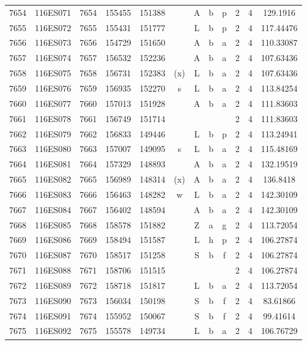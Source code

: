 \begin{tabular}{|*{12}{c|}}
7654 & 116ES071 & 7654 & 155455 & 151388 &  & A & b & p & 2 & 4 & 129.1916 \\ 
7655 & 116ES072 & 7655 & 155431 & 151777 &  & L & b & p & 2 & 4 & 117.44476 \\ 
7656 & 116ES073 & 7656 & 154729 & 151650 &  & A & b & a & 2 & 4 & 110.33087 \\ 
7657 & 116ES074 & 7657 & 156532 & 152236 &  & A & b & a & 2 & 4 & 107.63436 \\ 
7658 & 116ES075 & 7658 & 156731 & 152383 & (x) & L & b & a & 2 & 4 & 107.63436 \\ 
7659 & 116ES076 & 7659 & 156935 & 152270 & s & L & b & a & 2 & 4 & 113.84254 \\ 
7660 & 116ES077 & 7660 & 157013 & 151928 &  & A & b & a & 2 & 4 & 111.83603 \\ 
7661 & 116ES078 & 7661 & 156749 & 151714 &  &  &  &  & 2 & 4 & 111.83603 \\ 
7662 & 116ES079 & 7662 & 156833 & 149446 &  & L & b & p & 2 & 4 & 113.24941 \\ 
7663 & 116ES080 & 7663 & 157007 & 149095 & s & L & b & a & 2 & 4 & 115.48169 \\ 
7664 & 116ES081 & 7664 & 157329 & 148893 &  & A & b & a & 2 & 4 & 132.19519 \\ 
7665 & 116ES082 & 7665 & 156989 & 148314 & (x) & A & b & a & 2 & 4 & 136.8418 \\ 
7666 & 116ES083 & 7666 & 156463 & 148282 & w & L & b & a & 2 & 4 & 142.30109 \\ 
7667 & 116ES084 & 7667 & 156402 & 148594 &  & A & b & a & 2 & 4 & 142.30109 \\ 
7668 & 116ES085 & 7668 & 158578 & 151882 &  & Z & a & g & 2 & 4 & 113.72054 \\ 
7669 & 116ES086 & 7669 & 158494 & 151587 &  & L & h & p & 2 & 4 & 106.27874 \\ 
7670 & 116ES087 & 7670 & 158517 & 151258 &  & S & b & f & 2 & 4 & 106.27874 \\ 
7671 & 116ES088 & 7671 & 158706 & 151515 &  &  &  &  & 2 & 4 & 106.27874 \\ 
7672 & 116ES089 & 7672 & 158718 & 151817 &  & L & b & a & 2 & 4 & 113.72054 \\ 
7673 & 116ES090 & 7673 & 156034 & 150198 &  & S & b & f & 2 & 4 & 83.61866 \\ 
7674 & 116ES091 & 7674 & 155952 & 150067 &  & S & b & f & 2 & 4 & 99.41614 \\ 
7675 & 116ES092 & 7675 & 155578 & 149734 &  & L & b & a & 2 & 4 & 106.76729 \\ 

\end{tabular}
